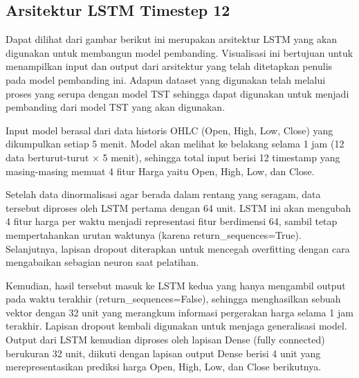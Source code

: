 \subsection{Arsitektur LSTM Timestep 12}
Dapat dilihat dari gambar berikut ini merupakan arsitektur LSTM yang akan digunakan untuk membangun model pembanding. Visualisasi ini bertujuan untuk menampilkan input dan output dari arsitektur yang telah ditetapkan penulis pada model pembanding ini. Adapun dataset yang digunakan telah melalui proses yang serupa dengan model TST sehingga dapat digunakan untuk menjadi pembanding dari model TST yang akan digunakan. 


Input model berasal dari data historis OHLC (Open, High, Low, Close) yang dikumpulkan setiap 5 menit. Model akan melihat ke belakang selama 1 jam (12 data berturut-turut × 5 menit), sehingga total input berisi 12 timestamp yang masing-masing memuat 4 fitur Harga yaitu Open, High, Low, dan Close.

Setelah data dinormalisasi agar berada dalam rentang yang seragam, data tersebut diproses oleh LSTM pertama dengan 64 unit. LSTM ini akan mengubah 4 fitur harga per waktu menjadi representasi fitur berdimensi 64, sambil tetap mempertahankan urutan waktunya (karena return\_sequences=True). Selanjutnya, lapisan dropout diterapkan untuk mencegah overfitting dengan cara mengabaikan sebagian neuron saat pelatihan.

Kemudian, hasil tersebut masuk ke LSTM kedua yang hanya mengambil output pada waktu terakhir (return\_sequences=False), sehingga menghasilkan sebuah vektor dengan 32 unit yang merangkum informasi pergerakan harga selama 1 jam terakhir. Lapisan dropout kembali digunakan untuk menjaga generalisasi model. Output dari LSTM kemudian diproses oleh lapisan Dense (fully connected) berukuran 32 unit, diikuti dengan lapisan output Dense berisi 4 unit yang merepresentasikan prediksi harga Open, High, Low, dan Close berikutnya.

